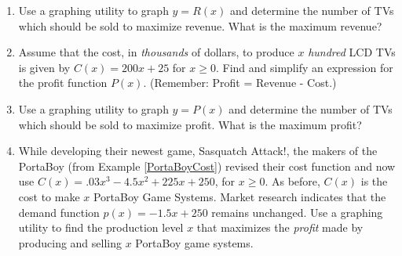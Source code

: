 \documentclass{ximera}
\begin{document}
\begin{enumerate}
\setcounter{enumi}{\value{HW}}

\item  Use a graphing utility to graph $y = R(x)$ and determine the number of TVs which should be sold to maximize revenue.  What is the maximum revenue? \label{lcdmaxprofitexerfirst}

\item Assume that the cost, in \textit{thousands} of dollars, to produce $x$ \textit{hundred} LCD TVs is given by $C(x) = 200x + 25$ for $x \geq 0$. Find and simplify an expression for the profit function $P(x)$.  (Remember: Profit = Revenue - Cost.)

\item  Use a graphing utility to graph $y = P(x)$ and determine the number of TVs which should be sold to maximize profit.  What is the maximum  profit? \label{lcdmaxprofitexerlast}

\item \label{newportaboycost} While developing their newest game, Sasquatch Attack!, the makers of the PortaBoy (from Example \ref{PortaBoyCost}) revised their cost function and now use $C(x) = .03x^{3} - 4.5x^{2} + 225x + 250$, for $x \geq 0$. As before, $C(x)$ is the cost to make $x$ PortaBoy Game Systems.  Market research indicates that the demand function $p(x) = -1.5x + 250$ remains unchanged.  Use a graphing utility to find the production level $x$ that maximizes the \textit{profit} made by producing and selling $x$ PortaBoy game systems.

\setcounter{HW}{\value{enumi}}
\end{enumerate}
\end{document}
